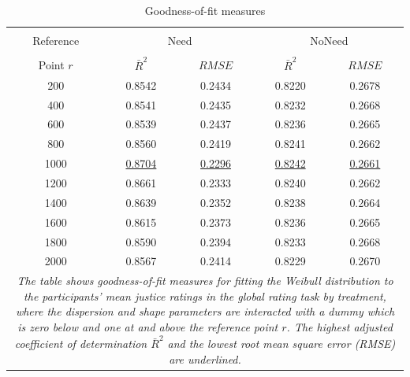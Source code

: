 \documentclass[12pt]{scrartcl}
\begin{document}
\begin{landscape}
\begin{table}[h!t!]
{\begin{tabular}{rrrrrrrrrrrrr}
         \end{tabular}
      }
   \end{table}
\end{landscape}

\clearpage
\begin{table}[h!t!]
   \centering
   \caption{Goodness-of-fit measures}\label{tab:goodness}
   \begin{tabular}{ccccc}                                                                                     \hline\\[-2ex]
      Reference   & \multicolumn{2}{c}{Need}                    & \multicolumn{2}{c}{NoNeed}                  \\\cline{2-5}\\[-2ex]
      Point $r$   & $\bar{R}^2$          & $RMSE$               & $\bar{R}^2$          & $RMSE$               \\\hline\hline
       200        & 0.8542               & 0.2434               & 0.8220               & 0.2678               \\
       400        & 0.8541               & 0.2435               & 0.8232               & 0.2668               \\
       600        & 0.8539               & 0.2437               & 0.8236               & 0.2665               \\
       800        & 0.8560               & 0.2419               & 0.8241               & 0.2662               \\
      1000        & \underline{0.8704}   & \underline{0.2296}   & \underline{0.8242}   & \underline{0.2661}   \\
      1200        & 0.8661               & 0.2333               & 0.8240               & 0.2662               \\
      1400        & 0.8639               & 0.2352               & 0.8238               & 0.2664               \\
      1600        & 0.8615               & 0.2373               & 0.8236               & 0.2665               \\
      1800        & 0.8590               & 0.2394               & 0.8233               & 0.2668               \\
      2000        & 0.8567               & 0.2414               & 0.8229               & 0.2670               \\\hline
      \multicolumn{5}{p{8.7cm}}{\footnotesize\textit{The table shows goodness-of-fit measures for fitting the Weibull distribution to the participants' mean justice ratings in the global rating task by treatment, where the dispersion and shape parameters are interacted with a dummy which is zero below and one at and above the reference point $r$. The highest adjusted coefficient of determination $\bar{R}^2$ and the lowest root mean square error (RMSE) are underlined.}}
   \end{tabular}
\end{table}
\end{document}

